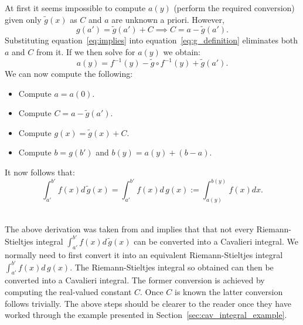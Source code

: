\documentclass[twoside,reqno,11pt]{fcaa-var} %
\begin{document}
\noindent
At first it seems impossible to compute $a(y)$ (perform the required conversion) given only $\widetilde{g}(x)$ as $C$ and $a$ are unknown a priori. However, 
\begin{equation}
\label{eq:implies}
g(a') = \widetilde{g}(a') + C \implies C = a - \widetilde{g}(a'). 
\end{equation}
Substituting equation~\eqref{eq:implies} into equation~\eqref{eq:g_definition} eliminates both $a$ and $C$ from it. If we then solve for $a(y)$ we obtain:
\begin{equation}
a(y) = f^{-1}(y)-\widetilde{g}\circ f^{-1}(y) + \widetilde{g}(a'). 
\end{equation}
We can now compute the following:
\begin{itemize}
\item Compute $a = a(0)$.
\item Compute $C = a - \widetilde{g}(a')$.
\item Compute $g(x) = \widetilde{g}(x) + C$.
\item Compute $b = g(b')$ and $b(y) = a(y) + (b-a)$.
\end{itemize}
It now follows that: 
\begin{equation}
\int_{a'}^{b'} f(x)d\,\widetilde{g}(x) = \int_{a'}^{b'} f(x)d\,g(x):=\int_{a(y)}^{b(y)}f(x)dx. 
\end{equation}\

\noindent
The above derivation was taken from \cite{grobler19} and implies that that not every Riemann-Stieltjes integral $\int_{a'}^{b'} f(x) d\,\widetilde{g}(x)$ can be converted into a Cavalieri integral. We normally need to first convert it into an equivalent Riemann-Stieltjes integral $\int_{a'}^{b'} f(x) d\,g(x)$. The Riemann-Stieltjes integral so obtained can then be converted into a Cavalieri integral. The former conversion is achieved by computing the real-valued constant $C$. Once $C$ is known the latter conversion follows trivially. The above steps should be clearer to the reader once they have worked through the example presented in Section~\ref{sec:cav_integral_example}.\\

\end{document}
